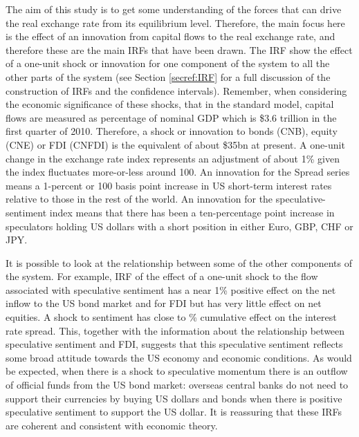 \documentclass[12pt, a4paper, oneside]{article}\usepackage[]{graphicx}\usepackage[]{color}
\begin{document}
The aim of this study is to get some understanding of the forces that can drive the real exchange rate from its equilibrium level. Therefore, the main focus here is the effect of an innovation from capital flows to the real exchange rate, and therefore these are the main IRFs that have been drawn.  The IRF show the effect of a one-unit shock or innovation for one component of the system to all the other parts of the system (see Section \ref{secref:IRF} for a full discussion of the construction of IRFs and the confidence intervals).  Remember, when considering the economic significance of these shocks, that in the standard model, capital flows are measured as percentage of nominal GDP which is \$3.6 trillion in the first quarter of 2010.  Therefore, a shock or innovation to bonds (CNB), equity (CNE) or FDI (CNFDI) is the equivalent of about \$35bn at present.  A one-unit change in the exchange rate index represents an adjustment of about 1\% given the index fluctuates more-or-less around 100.  An innovation for the Spread series means a 1-percent or 100 basis point increase in US short-term interest rates relative to those in the rest of the world.  An innovation for the speculative-sentiment index means that there has been a ten-percentage point increase in speculators holding US dollars with a short position in either Euro, GBP, CHF or JPY.  

It is possible to look at the relationship between some of the other components of the system.  For example, IRF of the effect of a one-unit shock to the flow associated with speculative sentiment has a near 1\% positive effect on the net inflow to the US bond market and for FDI but has very little effect on net equities.  A shock to sentiment has close to \% cumulative effect on the interest rate spread.  This, together with the information about the relationship between speculative sentiment and FDI, suggests that this speculative sentiment reflects some broad attitude towards the US economy and economic conditions.  As would be expected, when there is a shock to speculative momentum there is an outflow of official funds from the US bond market:  overseas central banks do not need to support their currencies by buying US dollars and bonds when there is positive speculative sentiment to support the US dollar.  It is reassuring that these IRFs are coherent and consistent with economic theory.  
\end{document}
